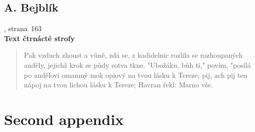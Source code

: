 \documentclass[dp.tex]{subfiles}
\begin{document}
\section*{A. Bejblík}
, strana~163
\\\textbf{Text čtrnácté strofy}
\begin{verse}
Pak vzduch zhoust a vůně, zdá se, z kadidelnic rozlila se
rozhoupaných anděly, jejichž krok se půdy sotva tkne.
"Ubožáku, bůh ti," povím, "posílá po andělovi
omamný mok opiový na tvou lásku k Tereze;
pij, ach pij ten nápoj na tvou lichou lásku k Tereze;
Havran řekl: Marno vše.
\end{verse}
\chapter{Second appendix}
\end{document}
